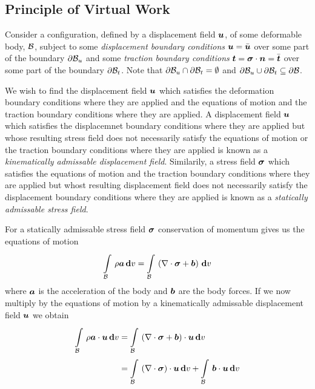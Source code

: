 \subsection{Principle of Virtual Work}

Consider a configuration, defined by a displacement field $\boldsymbol{u}$, of some
deformable body, $ \mathcal{B} $, subject to some \emph{displacement
  boundary conditions} $\boldsymbol{u}=\bar{\boldsymbol{u}}$ over some part of the
boundary $ \partial{\ensuremath{ \mathcal{B} }} _{u}$ and some \emph{traction boundary
  conditions} $\boldsymbol{t}=\boldsymbol{\mathit{\sigma}}\cdot\boldsymbol{n}=\bar{\boldsymbol{t}}$
over some part of the boundary $ \partial{\ensuremath{ \mathcal{B} }} _{t}$. Note that
$ \partial{\ensuremath{ \mathcal{B} }} _{u}\cap \partial{\ensuremath{ \mathcal{B} }} _{t}=\emptyset$
and
$ \partial{\ensuremath{ \mathcal{B} }} _{u}\cup \partial{\ensuremath{ \mathcal{B} }} _{t}\subseteq \partial{\ensuremath{ \mathcal{B} }} $.

We wish to find the displacement field $\boldsymbol{u}$ which satisfies the
deformation boundary conditions where they are applied and the equations of
motion and the traction boundary conditions where they are applied. A
displacement field $\boldsymbol{u}$ which satisfies the displacemnet boundary
conditions where they are applied but whose resulting stress field does not
necessarily satisfy the equations of motion or the traction boundary
conditions where they are applied is known as a \emph{kinematically admissable
  displacement field}. Similarily, a stress field $\boldsymbol{\mathit{\sigma}}$ which
satisfies the equations of motion and the traction boundary conditions where
they are applied but whost resulting displacement field does not necessarily
satisfy the displacement boundary conditions where they are applied is known
as a \emph{statically admissable stress field}.

For a statically admissable stress field $\boldsymbol{\mathit{\sigma}}$ conservation of
momentum gives us the equations of motion \ie
\begin{equation}
  \gint{\embedmanifold{B}}{}{\rho\vectr{a}}{v}=\gint{\embedmanifold{B}}{}{\pbrac{\divergence{}{\tensor{\sigma}}+\vectr{b}}}{v}
\end{equation}
where $\boldsymbol{a}$ is the acceleration of the body and $\boldsymbol{b}$ are the body
forces. If we now multiply by the equations of motion by a kinematically
admissable displacement field $\boldsymbol{u}$ we obtain
\begin{equation}
  \begin{split}
    \gint{\embedmanifold{B}}{}{\dotprod{\rho\vectr{a}}{\vectr{u}}}{v} &=
    \gint{\embedmanifold{B}}{}{\dotprod{\pbrac{\divergence{}{\tensor{\sigma}}+\vectr{b}}}{\vectr{u}}}{v}\\
    &=\gint{\embedmanifold{B}}{}{\dotprod{\pbrac{\divergence{}{\tensor{\sigma}}}}{\vectr{u}}}{v}+
    \gint{\embedmanifold{B}}{}{\dotprod{\vectr{b}}{\vectr{u}}}{v}
  \end{split}
  \label{eqn:equationsofwork}
\end{equation}

